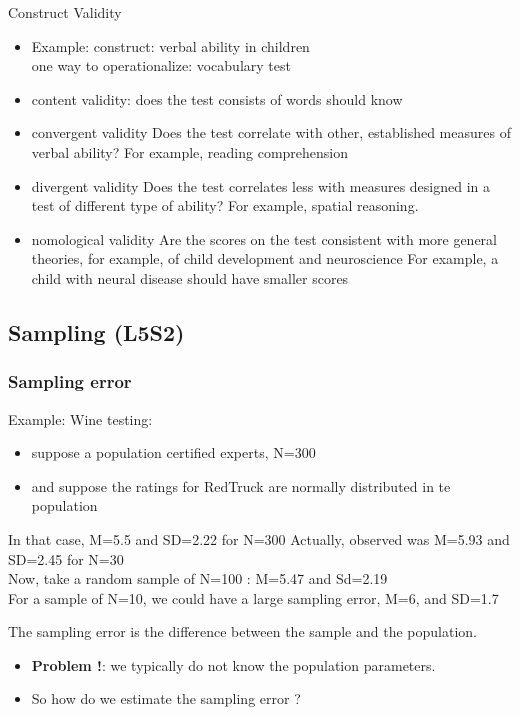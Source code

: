 \documentclass[11pt]{article}
\begin{document}
    Construct Validity
\begin{itemize}
\item Example: construct: verbal ability in children\\
one way to operationalize: vocabulary test
\item content validity: 
      does the test consists of words should know
\item convergent validity
      Does the test correlate with other, established measures of verbal ability?
      For example, reading comprehension
\item divergent validity
      Does the test correlates less with measures designed in a test of different type of ability?
      For example, spatial reasoning.
\item nomological validity
      Are the scores on the test consistent with more general theories, for example, of child development and neuroscience
      For example, a child with neural disease should have smaller scores
\end{itemize}
\subsection{Sampling (L5S2)}
\label{sec-2-5}
\subsubsection{Sampling error}
\label{sec-2-5-1}

    Example: Wine testing: 
\begin{itemize}
\item suppose a population certified experts,  N=300
\item and suppose the ratings for RedTruck are normally distributed in te population
\end{itemize}
    In that case, M=5.5 and SD=2.22 for N=300
    Actually, observed was M=5.93 and SD=2.45 for N=30 \\
    Now, take a random sample of N=100 : M=5.47 and Sd=2.19\\
    For a sample of N=10, we could have a large sampling error, M=6, and SD=1.7   

    The sampling error is the difference between the sample and the population.
\begin{itemize}
\item \textbf{Problem !}: we typically do not know the population parameters.
\item So how do we estimate the sampling error ?
\end{itemize}
\end{document}
